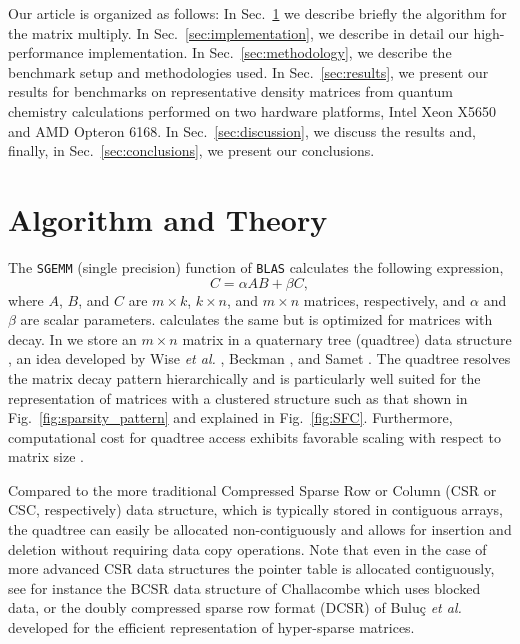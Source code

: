 Our article is organized as follows: In Sec.~\ref{sec:algorithm_and_theory} we
describe briefly the \SpAMM{} algorithm for the matrix multiply. In
Sec.~\ref{sec:implementation}, we describe in detail our high-performance
implementation. In Sec.~\ref{sec:methodology}, we describe the benchmark setup
and methodologies used. In Sec.~\ref{sec:results}, we present our results for
benchmarks on representative density matrices from quantum chemistry
calculations performed on two hardware platforms, Intel Xeon X5650 and AMD
Opteron 6168.  In Sec.~\ref{sec:discussion}, we discuss the results and,
finally, in Sec.~\ref{sec:conclusions}, we present our conclusions.

\section{Algorithm and Theory}
\label{sec:algorithm_and_theory}

The {\tt SGEMM} (single precision) function of {\tt BLAS} calculates the
following expression,
\begin{equation}
C = \alpha A B + \beta C,
\end{equation}
where $A$, $B$, and $C$ are $m \times k$, $k \times n$, and $m \times n$
matrices, respectively, and $\alpha$ and $\beta$ are scalar parameters.
\SpAMM{} calculates the same but is optimized for matrices with decay. In
\SpAMM{} we store an $m \times n$ matrix in a quaternary tree (quadtree) data
structure \cite{Finkel1974}, an idea developed by Wise \emph{et al.}
\cite{springerlink:10.1007/3-540-51084-2_9, Wise:1984:RMQ:1089389.1089398,
Wise:Ahnentafel}, Beckman \cite{beckman1993parallel}, and Samet
\cite{Samet:1990:DAS:77589, Samet:2006:DBDS}.  The quadtree resolves the
matrix decay pattern hierarchically and is particularly well suited for the
representation of matrices with a clustered structure such as that shown in
Fig.~\ref{fig:sparsity_pattern} and explained in Fig.~\ref{fig:SFC}.
Furthermore, computational cost for quadtree access exhibits favorable scaling
with respect to matrix size \cite{Wise1990282}.

Compared to the more traditional Compressed Sparse Row or Column (CSR or CSC,
respectively) data structure, which is typically stored in contiguous arrays,
the quadtree can easily be allocated non-contiguously and allows for insertion
and deletion without requiring data copy operations.  Note that even in the
case of more advanced CSR data structures the pointer table is allocated
contiguously, see for instance the BCSR data structure of Challacombe
\cite{Challacombe:2000:SpMM} which uses blocked data, or the doubly compressed
sparse row format (DCSR) of Bulu\c{c} \emph{et al.} \cite{Buluc2008} developed
for the efficient representation of hyper-sparse matrices.

